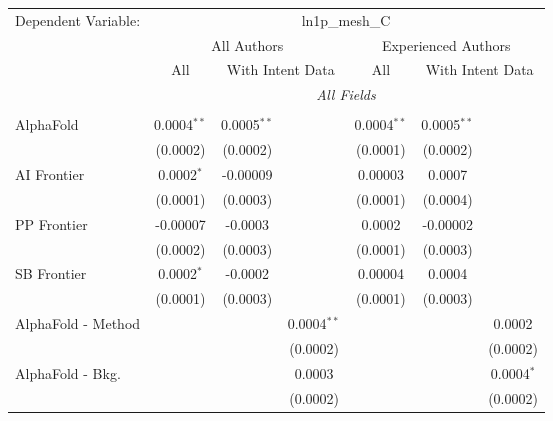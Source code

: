 \begingroup
\centering
\begin{tabular}{lcccccc}
   \tabularnewline \midrule \midrule
   Dependent Variable: & \multicolumn{6}{c}{ln1p\_mesh\_C}\\
 & \multicolumn{3}{c}{All Authors} & \multicolumn{3}{c}{Experienced Authors} \\
\cmidrule(lr){2-4} \cmidrule(lr){5-7}
 & \multicolumn{1}{c}{All} & \multicolumn{2}{c}{With Intent Data} & \multicolumn{1}{c}{All} & \multicolumn{2}{c}{With Intent Data} \\
\cmidrule(lr){2-2} \cmidrule(lr){3-4} \cmidrule(lr){5-5} \cmidrule(lr){6-7}
 & \multicolumn{6}{c}{\textit{All Fields}} \\ \\
   AlphaFold                     & 0.0004$^{**}$ & 0.0005$^{**}$ &                 & 0.0004$^{**}$ & 0.0005$^{**}$ &   \\   
                                 & (0.0002)      & (0.0002)      &                 & (0.0001)      & (0.0002)      &   \\   
   AI Frontier                   & 0.0002$^{*}$  & -0.00009      &                 & 0.00003       & 0.0007        &   \\   
                                 & (0.0001)      & (0.0003)      &                 & (0.0001)      & (0.0004)      &   \\   
   PP Frontier                   & -0.00007      & -0.0003       &                 & 0.0002        & -0.00002      &   \\   
                                 & (0.0002)      & (0.0003)      &                 & (0.0001)      & (0.0003)      &   \\   
   SB Frontier                   & 0.0002$^{*}$  & -0.0002       &                 & 0.00004       & 0.0004        &   \\   
                                 & (0.0001)      & (0.0003)      &                 & (0.0001)      & (0.0003)      &   \\   
   AlphaFold - Method            &               &               & 0.0004$^{**}$   &               &               & 0.0002\\   
                                 &               &               & (0.0002)        &               &               & (0.0002)\\   
   AlphaFold - Bkg.              &               &               & 0.0003          &               &               & 0.0004$^{*}$\\   
                                 &               &               & (0.0002)        &               &               & (0.0002)\\   

\end{tabular}
